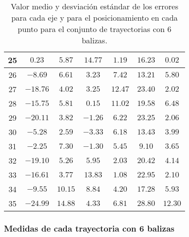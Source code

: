 \begin{table}[H]
\begin{tabular}{|c|c|c|c|c|c|c|}
                        25  & $0.23$    &  $5.87$   &  $14.77$   &  $1.19$   & $16.23$  &  $0.02$   \\ \hline
                        26  & $-8.69$   &  $6.61$   &  $3.23$    &  $7.42$   & $13.21$  &  $5.80$   \\ \hline
                        27  & $-18.76$  &  $4.02$   &  $3.25$    &  $12.47$  & $23.40$  &  $2.02$   \\ \hline
                        28  & $-15.75$  &  $5.81$   &  $0.15$    &  $11.02$  & $19.58$  &  $6.48$   \\ \hline
                        29  & $-20.11$  &  $3.82$   &  $-1.26$   &  $6.22$   & $23.25$  &  $2.06$   \\ \hline
                        30  & $-5.28$   &  $2.59$   &  $-3.33$   &  $6.18$   & $13.43$  &  $3.99$   \\ \hline
                        31  & $-2.25$   &  $7.30$   &  $-1.30$   &  $5.45$   & $9.10$   &  $3.65$   \\ \hline
                        32  & $-19.10$  &  $5.26$   &  $5.95$    &  $2.03$   & $20.42$  &  $4.14$   \\ \hline
                        33  & $-16.61$  &  $3.77$   &  $13.83$   &  $1.08$   & $22.95$  &  $2.10$   \\ \hline
                        34  & $-9.55$   &  $10.15$  &  $8.84$    &  $4.20$   & $17.28$  &  $5.93$   \\ \hline
                        35  & $-24.99$  &  $14.88$  &  $4.33$    &  $6.81$   & $28.80$  &  $12.30$  \\ \hline
        \end{tabular}
    \caption{Valor medio y desviación estándar de los errores para cada eje y para el posicionamiento en cada punto para el conjunto de trayectorias con 6 balizas.}
    \label{tab:media_lab_6_total}
\end{table}

\newpage
\subsubsection{Medidas de cada trayectoria con 6 balizas}


